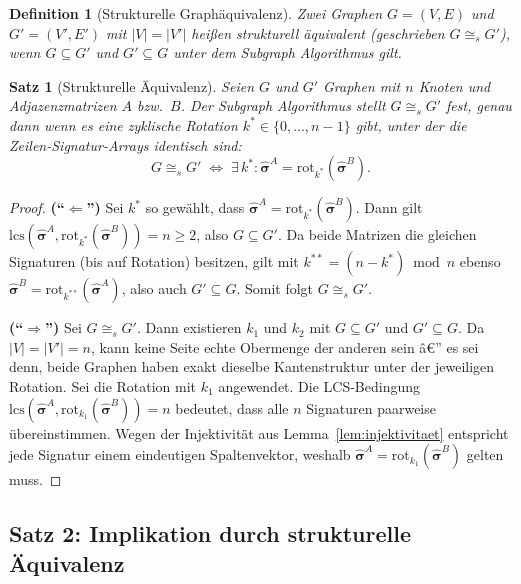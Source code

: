 ﻿\documentclass[12pt,a4paper]{report}
\newtheorem{definition}{Definition}[section]
\newtheorem{theorem}{Satz}[section]
\begin{document}
\begin{definition}[Strukturelle Graphäquivalenz]
\label{def:strukturell_aequivalent}
Zwei Graphen $G = (V, E)$ und $G' = (V', E')$ mit $|V| = |V'|$ heißen \emph{strukturell äquivalent} (geschrieben $G \cong_s G'$), wenn $G \subseteq G'$ \emph{und} $G' \subseteq G$ unter dem Subgraph Algorithmus gilt.
\end{definition}

\begin{theorem}[Strukturelle Äquivalenz]
\label{thm:strukturelle_aequivalenz}
Seien $G$ und $G'$ Graphen mit $n$ Knoten und Adjazenzmatrizen $A$ bzw.\ $B$. Der Subgraph Algorithmus stellt $G \cong_s G'$ fest, genau dann wenn es eine zyklische Rotation $k^* \in \{0,\ldots,n-1\}$ gibt, unter der die Zeilen-Signatur-Arrays identisch sind:
\[
G \cong_s G' \;\iff\; \exists\, k^* : \hat{\boldsymbol{\sigma}}^A = \mathrm{rot}_{k^*}(\hat{\boldsymbol{\sigma}}^B).
\]
\end{theorem}

\begin{proof}
\textbf{(``$\Leftarrow$'')} Sei $k^*$ so gewählt, dass $\hat{\boldsymbol{\sigma}}^A = \mathrm{rot}_{k^*}(\hat{\boldsymbol{\sigma}}^B)$. Dann gilt $\mathrm{lcs}(\hat{\boldsymbol{\sigma}}^A, \mathrm{rot}_{k^*}(\hat{\boldsymbol{\sigma}}^B)) = n \geq 2$, also $G \subseteq G'$. Da beide Matrizen die gleichen Signaturen (bis auf Rotation) besitzen, gilt mit $k^{**} = (n - k^*) \bmod n$ ebenso $\hat{\boldsymbol{\sigma}}^B = \mathrm{rot}_{k^{**}}(\hat{\boldsymbol{\sigma}}^A)$, also auch $G' \subseteq G$. Somit folgt $G \cong_s G'$.

\textbf{(``$\Rightarrow$'')} Sei $G \cong_s G'$. Dann existieren $k_1$ und $k_2$ mit $G \subseteq G'$ und $G' \subseteq G$. Da $|V| = |V'| = n$, kann keine Seite echte Obermenge der anderen sein â€” es sei denn, beide Graphen haben exakt dieselbe Kantenstruktur unter der jeweiligen Rotation. Sei die Rotation mit $k_1$ angewendet. Die LCS-Bedingung $\mathrm{lcs}(\hat{\boldsymbol{\sigma}}^A, \mathrm{rot}_{k_1}(\hat{\boldsymbol{\sigma}}^B)) = n$ bedeutet, dass alle $n$ Signaturen paarweise übereinstimmen. Wegen der Injektivität aus Lemma~\ref{lem:injektivitaet} entspricht jede Signatur einem eindeutigen Spaltenvektor, weshalb $\hat{\boldsymbol{\sigma}}^A = \mathrm{rot}_{k_1}(\hat{\boldsymbol{\sigma}}^B)$ gelten muss.
\end{proof}

\subsection{Satz 2: Implikation durch strukturelle Äquivalenz}
\end{document}
